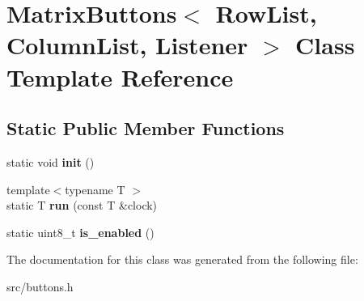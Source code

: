 \hypertarget{classMatrixButtons}{}\section{Matrix\+Buttons$<$ Row\+List, Column\+List, Listener $>$ Class Template Reference}
\label{classMatrixButtons}
\subsection*{Static Public Member Functions}
\begin{DoxyCompactItemize}
\item 
static void {\bfseries init} ()\hypertarget{classMatrixButtons_a28aaefa849e34b188d2a74293ead0e41}{}\label{classMatrixButtons_a28aaefa849e34b188d2a74293ead0e41}

\item 
{\footnotesize template$<$typename T $>$ }\\static T {\bfseries run} (const T \&clock)\hypertarget{classMatrixButtons_a8a751df6ba30a66be953d4098e8eadb3}{}\label{classMatrixButtons_a8a751df6ba30a66be953d4098e8eadb3}

\item 
static uint8\+\_\+t {\bfseries is\+\_\+enabled} ()\hypertarget{classMatrixButtons_ac9394408a6020172ef35dfaebed40784}{}\label{classMatrixButtons_ac9394408a6020172ef35dfaebed40784}

\end{DoxyCompactItemize}


The documentation for this class was generated from the following file\+:\begin{DoxyCompactItemize}
\item 
src/buttons.\+h\end{DoxyCompactItemize}
